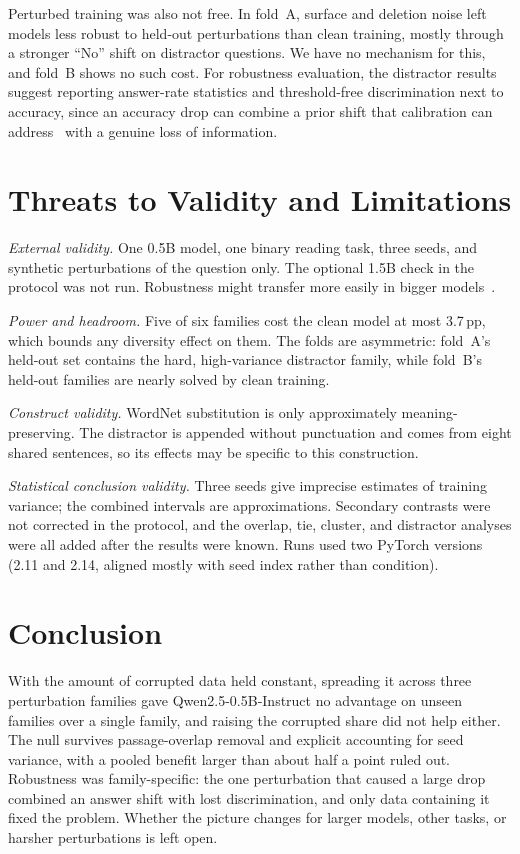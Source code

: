 \documentclass[conference]{IEEEtran}
\newcommand{\ppts}{\,pp}
\newcommand{\pfam}[1]{\textsf{#1}}
\begin{document}
Perturbed training was also not free. In fold~A, surface and deletion noise left models less robust to held-out perturbations than clean training, mostly through a stronger ``No'' shift on distractor questions. We have no mechanism for this, and fold~B shows no such cost. For robustness evaluation, the distractor results suggest reporting answer-rate statistics and threshold-free discrimination next to accuracy, since an accuracy drop can combine a prior shift that calibration can address~\cite{zhao2021calibrate} with a genuine loss of information.

\section{Threats to Validity and Limitations}
\label{sec:limitations}

\textit{External validity.} One 0.5B model, one binary reading task, three seeds, and synthetic perturbations of the question only. The optional 1.5B check in the protocol was not run. Robustness might transfer more easily in bigger models~\cite{alajrami2025noisy}.

\textit{Power and headroom.} Five of six families cost the clean model at most 3.7\ppts{}, which bounds any diversity effect on them. The folds are asymmetric: fold~A's held-out set contains the hard, high-variance \pfam{distractor} family, while fold~B's held-out families are nearly solved by clean training.

\textit{Construct validity.} WordNet substitution is only approximately meaning-preserving. The distractor is appended without punctuation and comes from eight shared sentences, so its effects may be specific to this construction.

\textit{Statistical conclusion validity.} Three seeds give imprecise estimates of training variance; the combined intervals are approximations. Secondary contrasts were not corrected in the protocol, and the overlap, tie, cluster, and distractor analyses were all added after the results were known. Runs used two PyTorch versions (2.11 and 2.14, aligned mostly with seed index rather than condition).

\section{Conclusion}
\label{sec:conclusion}

With the amount of corrupted data held constant, spreading it across three perturbation families gave Qwen2.5-0.5B-Instruct no advantage on unseen families over a single family, and raising the corrupted share did not help either. The null survives passage-overlap removal and explicit accounting for seed variance, with a pooled benefit larger than about half a point ruled out. Robustness was family-specific: the one perturbation that caused a large drop combined an answer shift with lost discrimination, and only data containing it fixed the problem. Whether the picture changes for larger models, other tasks, or harsher perturbations is left open.
\end{document}
